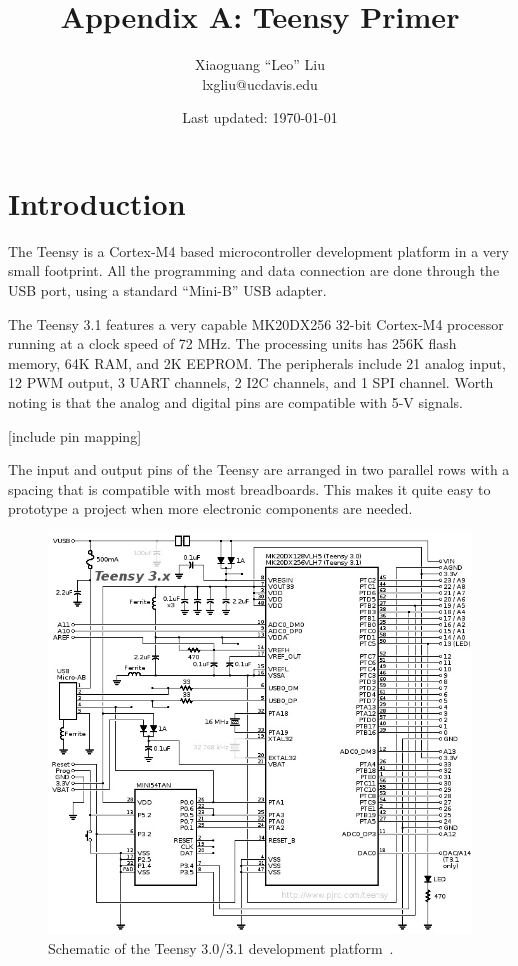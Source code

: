 \documentclass[letterpaper, 11pt]{article}
\begin{document}
\title{Appendix A: Teensy Primer}
\author{Xiaoguang ``Leo'' Liu\\lxgliu@ucdavis.edu}
\date{Last updated: \today}

\maketitle

\section{Introduction}
The Teensy is a Cortex-M4 based microcontroller development platform in a very small footprint. All the programming and data connection are done through the USB port, using a standard ``Mini-B'' USB adapter. 

The Teensy 3.1 features a very capable MK20DX256 32-bit Cortex-M4 processor running at a clock speed of 72 MHz. The processing units has 256K flash memory, 64K RAM, and 2K EEPROM. The peripherals include 21 analog input, 12 PWM output, 3 UART channels, 2 I2C channels, and 1 SPI channel. Worth noting is that the analog and digital pins are compatible with 5-V signals. 

[include pin mapping]

The input and output pins of the Teensy are arranged in two parallel rows with a spacing that is compatible with most breadboards. This makes it quite easy to prototype a project when more electronic components are needed.

\begin{figure}[ht]
	\centering
	\includegraphics[width=4.5in]{teensy_sch.png}
	\caption{Schematic of the Teensy 3.0/3.1 development platform~\cite{bib:teensy_sch}.}
	\label{fig:teensy_sch}
\end{figure}
\end{document}
